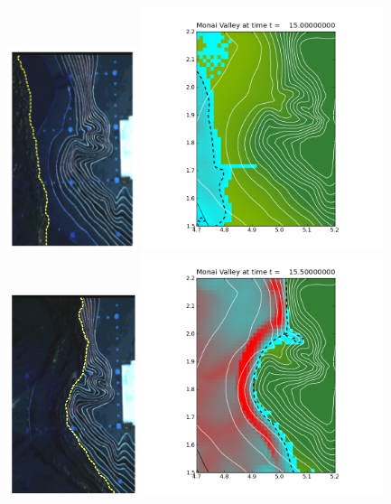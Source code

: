\begin{figure}[ht]
\hfil\includegraphics[width=1.5in]{bp7/movie/Frame10.png}\hfil
\hfil\includegraphics[width=2.8in]{bp7/figs423/frame0005fig10.png}\hfil
\vskip 5pt
\hfil\includegraphics[width=1.5in]{bp7/movie/Frame25.png}\hfil
\hfil\includegraphics[width=2.8in]{bp7/figs423/frame0007fig10.png}\hfil

\end{figure}
